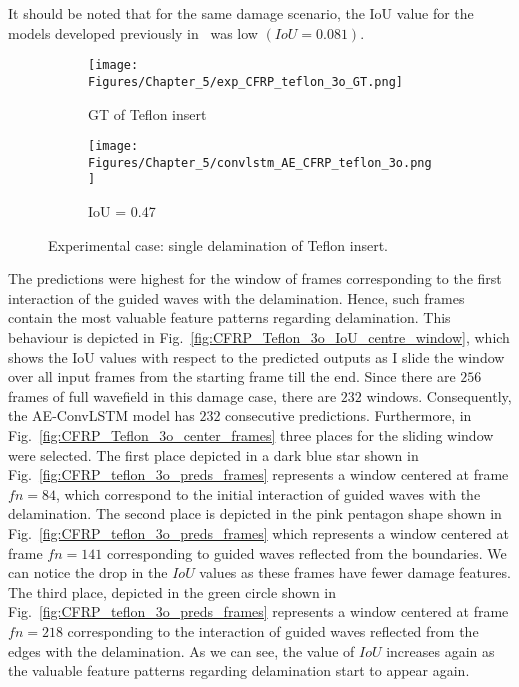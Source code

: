It should be noted that for the same damage scenario, the IoU value for the models developed previously in~\cite{Ijjeh2021} was low \((IoU=0.081)\).
\begin{figure} [!h]
	\centering
	\begin{subfigure}[b]{0.47\textwidth}
		\centering
		\texttt{[image: Figures/Chapter\_5/exp\_CFRP\_teflon\_3o\_GT.png]}
		\caption{GT of Teflon insert}
		\label{fig:exp_CFRP_teflon_3o_GT}
	\end{subfigure}
	\begin{subfigure}[b]{0.47\textwidth}
		\centering
		\texttt{[image: Figures/Chapter\_5/convlstm\_AE\_CFRP\_teflon\_3o.png]}
		\caption{IoU = 0.47}
		\label{fig:convlstm_AE_CFRP_teflon_3o}
	\end{subfigure}
	\caption{Experimental case: single delamination of Teflon insert.}
	\label{fig:exp_Teflon_insert}
\end{figure} 

The predictions were highest for the window of frames corresponding to the first interaction of the guided waves with the delamination.
Hence, such frames contain the most valuable feature patterns regarding delamination. 
This behaviour is depicted in Fig.~\ref{fig:CFRP_Teflon_3o_IoU_centre_window}, which shows the IoU values with respect to the predicted outputs as I slide the window over all input frames from the starting frame till the end.
Since there are \(256\) frames of full wavefield in this damage case, there are \(232\) windows.
Consequently, the AE-ConvLSTM model has \(232\) consecutive predictions.
Furthermore, in Fig.~\ref{fig:CFRP_Teflon_3o_center_frames} three places for the sliding window were selected. 
The first place depicted in a dark blue star shown in Fig.~\ref{fig:CFRP_teflon_3o_preds_frames} represents a window centered at frame \(fn=84\), which correspond to the initial interaction of guided waves with the delamination.
The second place is depicted in the pink pentagon shape shown in Fig.~\ref{fig:CFRP_teflon_3o_preds_frames} which represents a window centered at frame \(fn=141\) corresponding to guided waves reflected from the boundaries.
We can notice the drop in the \(IoU\) values as these frames have fewer damage features.
The third place, depicted in the green circle shown in Fig.~\ref{fig:CFRP_teflon_3o_preds_frames} represents a window centered at frame \(fn=218\) corresponding to the interaction of guided waves reflected from the edges with the delamination.
As we can see, the value of \(IoU\) increases again as the valuable feature patterns regarding delamination start to appear again.

